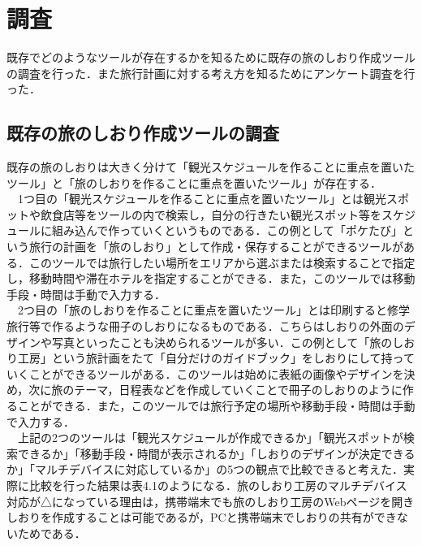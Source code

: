 \documentclass{funthesis}
\begin{document}





\chapter{調査}%

既存でどのようなツールが存在するかを知るために既存の旅のしおり作成ツールの調査を行った．また旅行計画に対する考え方を知るためにアンケート調査を行った．


\section{既存の旅のしおり作成ツールの調査}

既存の旅のしおりは大きく分けて「観光スケジュールを作ることに重点を置いたツール」と「旅のしおりを作ることに重点を置いたツール」が存在する．\\
　1つ目の「観光スケジュールを作ることに重点を置いたツール」とは観光スポットや飲食店等をツールの内で検索し，自分の行きたい観光スポット等をスケジュールに組み込んで作っていくというものである．この例として「ポケたび」という旅行の計画を「旅のしおり」として作成・保存することができるツールがある．このツールでは旅行したい場所をエリアから選ぶまたは検索することで指定し，移動時間や滞在ホテルを指定することができる．また，このツールでは移動手段・時間は手動で入力する．\\
　2つ目の「旅のしおりを作ることに重点を置いたツール」とは印刷すると修学旅行等で作るような冊子のしおりになるものである．こちらはしおりの外面のデザインや写真といったことも決められるツールが多い．この例として「旅のしおり工房」\cite{tripkobo}という旅計画をたて「自分だけのガイドブック」をしおりにして持っていくことができるツールがある．このツールは始めに表紙の画像やデザインを決め，次に旅のテーマ，日程表などを作成していくことで冊子のしおりのように作ることができる．また，このツールでは旅行予定の場所や移動手段・時間は手動で入力する．\\
　上記の2つのツールは「観光スケジュールが作成できるか」「観光スポットが検索できるか」「移動手段・時間が表示されるか」「しおりのデザインが決定できるか」「マルチデバイスに対応しているか」の5つの観点で比較できると考えた．実際に比較を行った結果は表4.1のようになる．旅のしおり工房のマルチデバイス対応が△になっている理由は，携帯端末でも旅のしおり工房のWebページを開きしおりを作成することは可能であるが，PCと携帯端末でしおりの共有ができないためである．
\end{document}
